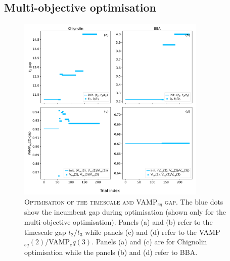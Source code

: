 \documentclass{article}
\begin{document}
\FloatBarrier
\clearpage


\subsection{Multi-objective optimisation}

\begin{figure}[ht]
    \centering
    \includegraphics[width=0.8\textwidth]{SI_figures/optimisation_gap_summary.pdf}
    \caption{\textsc{Optimisation of the timescale and VAMP$_{eq}$ gap.} The blue dots show the incumbent gap during optimisation (shown only for the multi-objective optimisation). Panels (a) and (b) refer to the timescale gap $t_2/t_3$ while panels (c) and (d) refer to the VAMP$_{eq}(2)$/VAMP$_eq(3)$. Panels (a) and (c) are for Chignolin optimisation while the panels (b) and (d) refer to BBA.}
    \label{fig:gap_optimiation}
\end{figure}

\FloatBarrier
\clearpage


\end{document}
